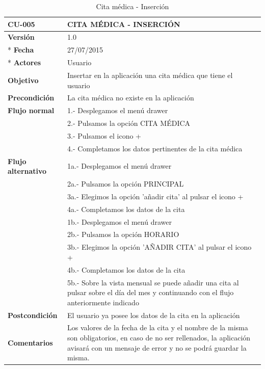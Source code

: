 \documentclass[../pfc.tex]{subfiles}
\begin{document}
	\begin{table}[H]
		\centering
		\begin{tabular}[t]{|p{3cm}|p{9.5cm}|}
			\hline \textbf{CU-005} & \textbf{CITA MÉDICA - INSERCIÓN} \\*
			\hline\hline \textbf{Versión} & 1.0 \\ *
			\hline\hline \textbf{Fecha} & 27/07/2015 \\ *
			\hline\textbf{Actores} 	& Usuario\\*
			\hline \textbf{Objetivo} & Insertar en la aplicación una cita médica que tiene el usuario\\* 			
			\hline \textbf{Precondición} & La cita médica no existe en la aplicación\\* 
			\hline \textbf{Flujo normal} & 1.- Desplegamos el menú drawer \\* 
			& 2.- Pulsamos la opción CITA MÉDICA\\*	
			& 3.- Pulsamos el icono +\\*	
			& 4.- Completamos los datos pertinentes de la cita médica\\*	
			\hline \textbf{Flujo alternativo} & 1a.- Desplegamos el menú drawer \\* 
			& 2a.- Pulsamos la opción PRINCIPAL \\*	
			& 3a.- Elegimos la opción 'añadir cita' al pulsar el icono +\\*	
			& 4a.- Completamos los datos de la cita\\*	
			& 1b.- Desplegamos el menú drawer \\* 
			& 2b.- Pulsamos la opción HORARIO \\*	
			& 3b.- Elegimos la opción 'AÑADIR CITA' al pulsar el icono +\\*	
			& 4b.- Completamos los datos de la cita\\*	
			& 5b.- Sobre la vista mensual se puede añadir una cita al pulsar sobre el día del mes y continuando con el flujo anteriormente indicado\\*	
			\hline \textbf{Postcondición} & El usuario ya posee los datos de la cita en la aplicación \\* 
			\hline \textbf{Comentarios}   & Los valores de la fecha de la cita y el nombre de la misma son obligatorios, en caso de no ser rellenados, la aplicación avisará con un mensaje de error y no se podrá guardar la misma.\\*
			\hline
		\end{tabular}
		\caption{Cita médica - Inserción}
		\label{tabla:caso005}

	\end{table}
\end{document}
